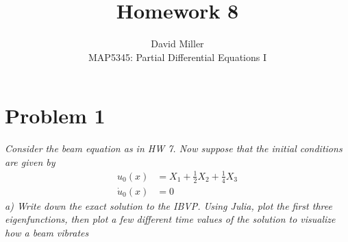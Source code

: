 \documentclass[12pt]{article}
\theoremstyle{remark}
\begin{document}
 
\title{Homework 8}
\author{David Miller \\ 
MAP5345: Partial Differential Equations I} 
 
\maketitle

\section*{Problem 1}

\textit{Consider the beam equation as in HW 7. Now suppose that the initial conditions are given by}
\begin{align}
	u_0(x) & = X_1 + \frac{1}{2}X_2 + \frac{1}{4}X_3 \\
	\dot{u}_0(x) & = 0
\end{align}
\textit{a) Write down the exact solution to the IBVP. Using Julia, plot the first three eigenfunctions, then plot a few different time values of the solution to visualize how a beam vibrates} \\
\end{document}
